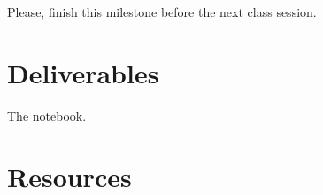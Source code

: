 Please, finish this milestone before the next class session.

\section{Deliverables}

The notebook.

\section{Resources}

\renewcommand{\addcontentsline}[3]{} %

